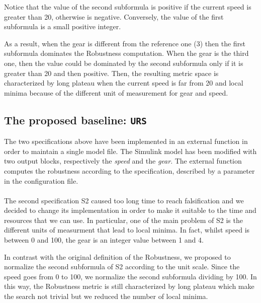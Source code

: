 \documentclass[11pt]{article}
\begin{document}
Notice that the value of the second subformula is positive if the current speed is greater than 20, otherwise is negative. Conversely, the value of the first subformula is a small positive integer.

As a result, when the gear is different from the reference one (3) then the first subformula dominates the Robustness computation. When the gear is the third one, then the value could be dominated by     the second subformula only if it is greater than 20 and then positive. Then, the resulting metric space is characterized by long plateau when the current speed is far from 20 and local minima because of  the different unit of measurement for gear and speed.

\subsection{The proposed baseline: \texttt{URS}}
The two specifications above have been implemented in an external function in order to maintain a single model file. The Simulink model has been modified with two output blocks, respectively the \textit{speed} and the \textit{gear}. The external function computes the robustness according to the specification, described by a parameter in the configuration file.
\\ \\
The second specification S2 caused too long time to reach falsification and we decided to change its implementation in order to make it suitable to the time and resources that we can use. In particular, one of the main problem of S2 is the different units of measurment that lead to local minima. In fact, whilst speed is between 0 and 100, the gear is an integer value between 1 and 4.

In contrast with the original definition of the Robustness, we proposed to normalize the second subformula of S2 according to the unit scale. Since the speed goes from 0 to 100, we normalize the second subformula dividing by 100. In this way, the Robustness metric is still characterized by long plateau which make the search not trivial but we reduced the number of local minima.
\end{document}
